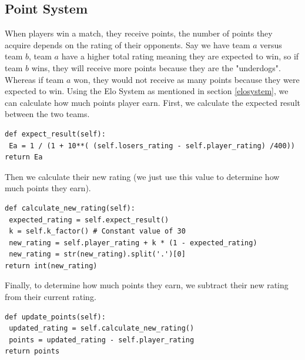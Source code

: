 \newpage
\subsection{Point System}
When players win a match, they receive points, the number of points they acquire depends on the rating of their opponents. \hfill \break
Say we have team $a$ versus team $b$, team $a$ have a higher total rating meaning they are expected to win, so if team $b$ wins, they will receive more points because they are the "underdogs". Whereas if team $a$ won, they would not receive as many points because they were expected to win. \hfill \break
Using the Elo System as mentioned in section \ref{elosystem}, we can calculate how much points player earn.\hfill \break
First, we calculate the expected result between the two teams.
\begin{verbatim}
def expect_result(self):     
 Ea = 1 / (1 + 10**( (self.losers_rating - self.player_rating) /400))
return Ea
\end{verbatim}

Then we calculate their new rating (we just use this value to determine how much points they earn).

\begin{verbatim}
def calculate_new_rating(self):
 expected_rating = self.expect_result()
 k = self.k_factor() # Constant value of 30
 new_rating = self.player_rating + k * (1 - expected_rating)
 new_rating = str(new_rating).split('.')[0]
return int(new_rating)
\end{verbatim}

Finally, to determine how much points they earn, we subtract their new rating from their current rating.

\begin{verbatim}
def update_points(self):    
 updated_rating = self.calculate_new_rating()
 points = updated_rating - self.player_rating
return points
\end{verbatim}

\newpage
